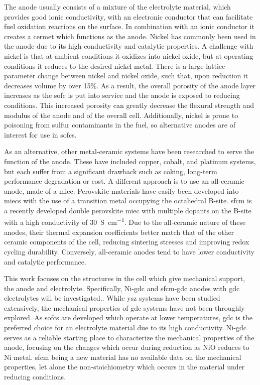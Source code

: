     The anode usually consists of a mixture of the electrolyte material, which provides good ionic conductivity, with an electronic conductor that can facilitate fuel oxidation reactions on the surface.
    In combination with an ionic conductor it creates a cermet which functions as the anode.
    Nickel has commonly been used in the anode due to its high conductivity and catalytic properties.%
    A challenge with nickel is that at ambient conditions it oxidizes into nickel oxide, but at operating conditions it reduces to the desired nickel metal.
    There is a large lattice parameter change between nickel and nickel oxide, such that, upon reduction it decreases volume by over 15\%.
    As a result, the overall porosity of the anode layer increases as the \gls{sofc} is put into service and the anode is exposed to reducing conditions.\cite{Gutierrez-Mora2002,Yu2007}
    This increased porosity can greatly decrease the flexural strength and modulus of the anode and of the overall cell.\cite{Callister2014,Barsoum2003}
    Additionally, nickel is prone to poisoning from sulfur contaminants in the fuel, so alternative anodes are of interest for use in \glspl{sofc}.

    As an alternative, other metal-ceramic systems have been researched to serve the function of the anode.
    These have included copper, cobalt, and platinum systems, but each suffer from a significant drawback such as coking, long-term performance degradation or cost.
    A different approach is to use an all-ceramic anode, made of a \gls{miec}.
    Perovskite materials have easily been developed into \glspl{miec} with the use of a transition metal occupying the octahedral B-site.
    \gls{sfcm} is a recently developed double perovskite \gls{miec} with multiple dopants on the B-site with a high conductivity of \SI{30}{S\per\centi\meter}.\cite{Pan,Hussaina,Hussain}
    Due to the all-ceramic nature of these anodes, their thermal expansion coefficients better match that of the other ceramic components of the cell, reducing sintering stresses and improving redox cycling durability.
    Conversely, all-ceramic anodes tend to have lower conductivity and catalytic performance.

    This work focuses on the structures in the cell which give mechanical support, the anode and electrolyte.
    Specifically, Ni-\gls{gdc} and \gls{sfcm}-\gls{gdc} anodes with \gls{gdc} electrolytes will be investigated..
    While \gls{ysz} systems have been studied extensively, the mechanical properties of \gls{gdc} systems have not been throughly explored.
    As \glspl{sofc} are developed which operate at lower temperatures, \gls{gdc} is the preferred choice for an electrolyte material due to its high conductivity.
    Ni-\gls{gdc} serves as a reliable starting place to characterize the mechanical properties of the anode, focusing on the changes which occur during reduction as NiO reduces to Ni metal.
    \gls{sfcm} being a new material has no available data on the mechanical properties, let alone the non-stoichiometry which occurs in the material under reducing conditions.

